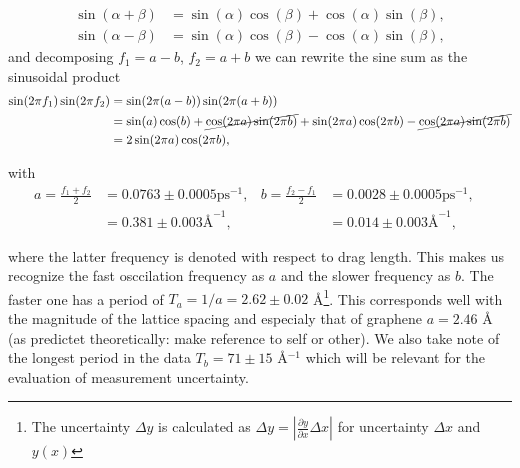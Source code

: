 \begin{align*}
\sin (\alpha+\beta) &= \sin (\alpha) \cos (\beta) + \cos (\alpha) \sin (\beta), \\
\sin (\alpha-\beta) &= \sin (\alpha) \cos (\beta) - \cos (\alpha) \sin (\beta),
\end{align*}
and decomposing $f_1 = a - b$, $f_2 = a + b$ we can rewrite the sine sum as the sinusoidal product
\begin{align*}
  \sin(2\pi f_1) \sin(2\pi f_2) &= \sin(2\pi (a - b)) \sin(2\pi (a + b)) \\
  &= \sin(a)\cos(b) + \cancel{\cos(2\pi a)\sin(2\pi b)} + \sin(2\pi a)\cos(2\pi b) - \cancel{\cos(2\pi a)\sin(2\pi b)} \\
  &= 2 \sin(2\pi a) \cos(2\pi b),
\end{align*} 

with 
\begin{align*}
  a = \frac{f_1 + f_2}{2} &= 0.0763 \pm 0.0005 \text{ps}^{-1},& 
  b = \frac{f_2 - f_1}{2} &= 0.0028 \pm 0.0005 \text{ps}^{-1},& \\
  &= 0.381 \pm 0.003 \text{Å}^{-1},& 
  &= 0.014 \pm 0.003 \text{Å}^{-1},& 
\end{align*}

where the latter frequency is denoted with respect to drag length. This makes us recognize the fast osccilation frequency as $a$ and the slower frequency as $b$. The faster one has a period of $T_a = 1/a = 2.62 \pm 0.02$ Å\footnote{The uncertainty $\Delta y$ is calculated as $\Delta y = \left|\frac{\partial y}{\partial x} \Delta x \right|$ for uncertainty $\Delta x$ and $y(x)$}. This corresponds well with the magnitude of the lattice spacing and especialy that of graphene $a = 2.46$ Å (as predictet theoretically: make reference to self or other). We also take note of the longest period in the data $T_b = 71 \pm 15$ Å$^{-1}$ which will be relevant for the evaluation of measurement uncertainty.




